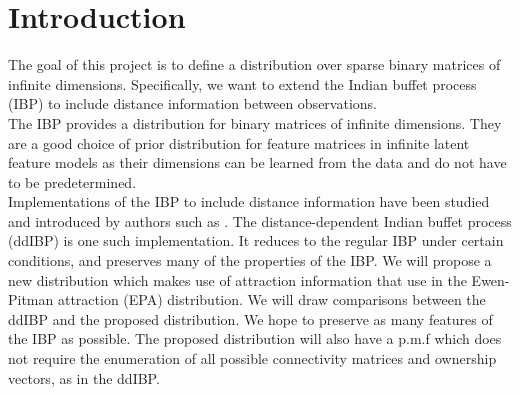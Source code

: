 \chapter{Introduction} %

The goal of this project is to define a distribution over sparse binary
matrices of infinite dimensions. Specifically, we want to extend the Indian
buffet process (IBP) to include distance information between observations.\\

\noindent
The IBP provides a distribution for binary matrices of infinite dimensions.
They are a good choice of prior distribution for feature matrices in infinite
latent feature models as their dimensions can be learned from the data and do
not have to be predetermined.\\

\noindent
Implementations of the IBP to include distance information have been studied
and introduced by authors such as \cite{ddibp}. The distance-dependent Indian
buffet process (ddIBP) is one such implementation. It reduces to the regular
IBP under certain conditions, and preserves many of the properties of the IBP.
We will propose a new distribution which makes use of attraction information
that \cite{epa} use in the Ewen-Pitman attraction (EPA) distribution.  We will
draw comparisons between the ddIBP and the proposed distribution.  We hope to
preserve as many features of the IBP as possible. The proposed distribution
will also have a p.m.f which does not require the enumeration of all possible
connectivity matrices and ownership vectors, as in the ddIBP.\\
